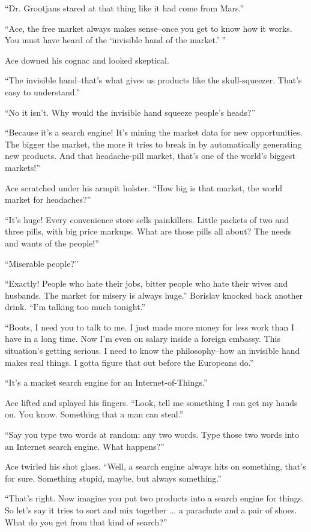 \documentclass[20 pt,twoside,extrafontsizes,final]{memoir}
\begin{document}
``Dr. Grootjans stared at that thing like it had come from Mars.''

``Ace, the free market always makes sense--once you get to know how it works. You must have heard of the `invisible hand of the market.' ''

Ace downed his cognac and looked skeptical.

``The invisible hand--that's what gives us products like the skull-squeezer. That's easy to understand.''

``No it isn't. Why would the invisible hand squeeze people's heads?''

``Because it's a search engine! It's mining the market data for new opportunities. The bigger the market, the more it tries to break in by automatically generating new products. And that headache-pill market, that's one of the world's biggest markets!''

Ace scratched under his armpit holster. ``How big is that market, the world market for headaches?''

``It's huge! Every convenience store sells painkillers. Little packets of two and three pills, with big price markups. What are those pills all about? The needs and wants of the people!''

``Miserable people?''

``Exactly! People who hate their jobs, bitter people who hate their wives and husbands. The market for misery is always huge.'' Borislav knocked back another drink. ``I'm talking too much tonight.''

``Boots, I need you to talk to me. I just made more money for less work than I have in a long time. Now I'm even on salary inside a foreign embassy. This situation's getting serious. I need to know the philosophy--how an invisible hand makes real things. I gotta figure that out before the Europeans do.''

``It's a market search engine for an Internet-of-Things.''

Ace lifted and splayed his fingers. ``Look, tell me something I can get my hands on. You know. Something that a man can steal.''

``Say you type two words at random: any two words. Type those two words into an Internet search engine. What happens?''

Ace twirled his shot glass. ``Well, a search engine always hits on something, that's for sure. Something stupid, maybe, but always something.''

``That's right. Now imagine you put two products into a search engine for things. So let's say it tries to sort and mix together ... a parachute and a pair of shoes. What do you get from that kind of search?''
\end{document}
